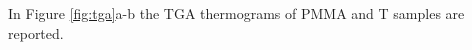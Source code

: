 \documentclass[a4paper, 11pt]{article}
\begin{document}
In Figure \ref{fig:tga}a-b the TGA thermograms of PMMA and T samples are reported. 
\begin{figure}[htp]
\centering
{} 
\subfloat[][]

\end{figure}
\end{document}
